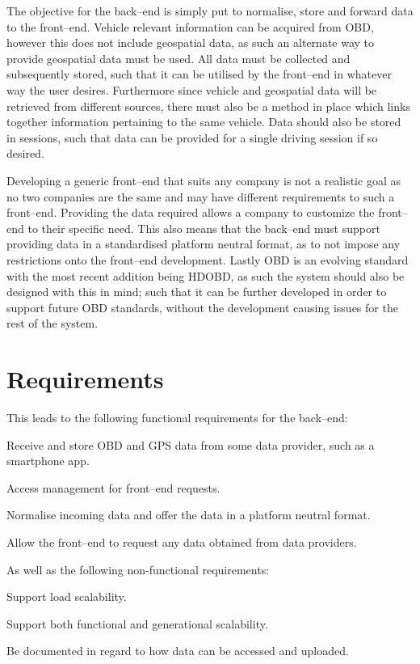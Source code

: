 \bigskip
The objective for the back--end is simply put to normalise, store and forward data to the front--end.
Vehicle relevant information can be acquired from \ac{OBD}, however this does not include geospatial data, as such an alternate way to provide geospatial data must be used.
All data must be collected and subsequently stored, such that it can be utilised by the front--end in whatever way the user desires.
Furthermore since vehicle and geospatial data will be retrieved from different sources, there must also be a method in place which links together information pertaining to the same vehicle.
Data should also be stored in sessions, such that data can be provided for a single driving session if so desired.

Developing a generic front--end that suits any company is not a realistic goal as no two companies are the same and may have different requirements to such a front--end.
Providing the data required allows a company to customize the front--end to their specific need.
This also means that the back--end must support providing data in a standardised platform neutral format, as to not impose any restrictions onto the front--end development.
Lastly \ac{OBD} is an evolving standard with the most recent addition being \ac{HDOBD}, as such the system should also be designed with this in mind; such that it can be further developed in order to support future \ac{OBD} standards, without the development causing issues for the rest of the system.

\section{Requirements}\label{sec:requirements}
This leads to the following functional requirements for the back--end:
\begin{eletterate}
    \item Receive and store \ac{OBD} and GPS data from some data provider, such as a smartphone app.
    \item Access management for front--end requests.
    \item Normalise incoming data and offer the data in a platform neutral format. %
    \item Allow the front--end to request any data obtained from data providers.
\end{eletterate}
As well as the following non-functional requirements:
\begin{eletterate}[resume]
    \item Support load scalability.%
    \item Support both functional and generational scalability.
    \item Be documented in regard to how data can be accessed and uploaded.
\end{eletterate}



